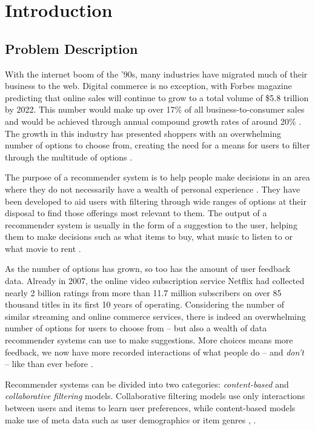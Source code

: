 \chapter{Introduction}

\label{intro} %

\section{Problem Description}
With the internet boom of the '90s, many industries have migrated much of their business to the web. Digital commerce is no exception, with Forbes magazine predicting that online sales will continue to grow to a total volume of \$5.8 trillion by 2022. This number would make up over 17\% of all business-to-consumer sales and would be achieved through annual compound growth rates of around 20\% \parencite{forbes2018growth}. The growth in this industry has presented shoppers with an overwhelming number of options to choose from, creating the need for a means for users to filter through the multitude of options \parencite{handbook_1.1_intro}.

The purpose of a  recommender system is to help people make decisions in an area where they do not necessarily have a wealth of personal experience \parencite{rs_1.1_Resnick}. They have been developed to aid users with filtering through wide ranges of options at their disposal to find those offerings most relevant to them. The output of a recommender system is usually in the form of a suggestion to the user, helping them to make decisions such as what items to buy, what music to listen to or what movie to rent \parencite{handbook_1.1_intro}.

As the number of options has grown, so too has the amount of user feedback data. Already in 2007, the online video subscription service Netflix had collected nearly 2 billion ratings from more than 11.7 million subscribers on over 85 thousand titles in its first 10 years of operating. Considering the number of similar streaming and online commerce services, there is indeed an overwhelming number of options for users to choose from -- but also a wealth of data recommender systems can use to make suggestions.
More choices means more feedback, we now have more recorded interactions of what people do -- and \textit{don't} -- like than ever before \parencite{netflix_description}.

Recommender systems can be divided into two categories: \textit{content-based} and \textit{collaborative filtering} models. Collaborative filtering models use only interactions between users and items to learn user preferences, while content-based models make use of meta data such as user demographics or item genres \parencite{handbook_1.5_cf}, \parencite{handbook_1.3_content-based}.

